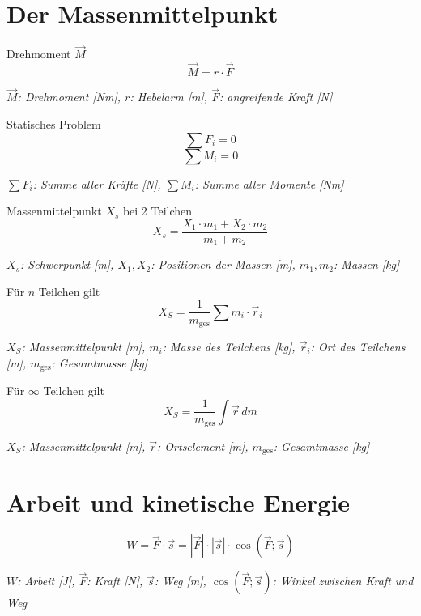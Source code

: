 \documentclass[a4paper,10pt]{article}
\newenvironment{displayformula}
{
	\begin{framed}
		\color{formulaColor}
	}
	{\end{framed}}
\newcommand{\formulalegend}[1]{%
	\par\vspace{0.5ex}%
	{{\color{legendColor}\RaggedRight\small\textit{#1}}}%
	\par\vspace{1.5ex}%
}
\begin{document}
\section{Der Massenmittelpunkt}

\begin{displayformula}
	Drehmoment \( \vec{M} \)
	\[
	\vec{M} = r \cdot \vec{F}
	\]
\end{displayformula}
\formulalegend{
	\( \vec{M} \): Drehmoment [Nm], \( r \): Hebelarm [m], \( \vec{F} \): angreifende Kraft [N]
}

\begin{displayformula}
	Statisches Problem
	\[
	\sum F_i = 0
	\]
	\[
	\sum M_i = 0
	\]
\end{displayformula}
\formulalegend{
	\( \sum F_i \): Summe aller Kräfte [N], \( \sum M_i \): Summe aller Momente [Nm]
}

\begin{displayformula}
	Massenmittelpunkt \( X_s \) bei 2 Teilchen
	\[
	X_s = \frac{X_1 \cdot m_1 + X_2 \cdot m_2}{m_1 + m_2}
	\]
\end{displayformula}
\formulalegend{
	\( X_s \): Schwerpunkt [m], \( X_1, X_2 \): Positionen der Massen [m], \( m_1, m_2 \): Massen [kg]
}

\begin{displayformula}
	Für \( n \) Teilchen gilt
	\[
	X_S = \frac{1}{m_{\text{ges}}} \sum m_i \cdot \vec{r}_i
	\]
\end{displayformula}
\formulalegend{
	\( X_S \): Massenmittelpunkt [m], \( m_i \): Masse des Teilchens [kg], \( \vec{r}_i \): Ort des Teilchens [m], \( m_{\text{ges}} \): Gesamtmasse [kg]
}

\begin{displayformula}
	Für \( \infty \) Teilchen gilt
	\[
	X_S = \frac{1}{m_{\text{ges}}} \int \vec{r} \, dm
	\]
\end{displayformula}
\formulalegend{
	\( X_S \): Massenmittelpunkt [m], \( \vec{r} \): Ortselement [m], \( m_{\text{ges}} \): Gesamtmasse [kg]
}



\section{Arbeit und kinetische Energie}

\begin{displayformula}
	\[
	W = \vec{F} \cdot \vec{s} = |\vec{F}| \cdot |\vec{s}| \cdot \cos(\vec{F}; \vec{s})
	\]
\end{displayformula}
\formulalegend{
	\( W \): Arbeit [J], \( \vec{F} \): Kraft [N], \( \vec{s} \): Weg [m], \( \cos(\vec{F}; \vec{s}) \): Winkel zwischen Kraft und Weg
}
\end{document}
